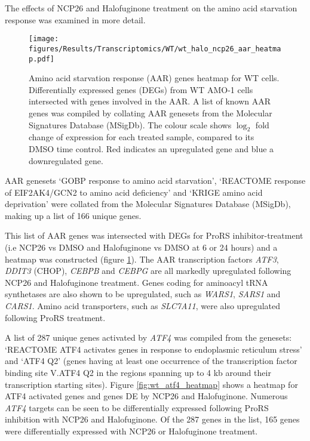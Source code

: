 The effects of NCP26 and Halofuginone treatment on the amino acid starvation response was examined in more detail.
\begin{figure}[p]
\centering
\texttt{[image: figures/Results/Transcriptomics/WT/wt\_halo\_ncp26\_aar\_heatmap.pdf]}
\caption[Amino acid starvation response genes heatmap WT cells]{Amino acid starvation response (AAR) genes heatmap for WT cells.
Differentially expressed genes (DEGs) from WT AMO-1 cells intersected with genes involved in the AAR.
A list of known AAR genes was compiled by collating AAR genesets from the Molecular Signatures Database (MSigDb).
The colour scale shows $\log_{2}$ fold change of expression for each treated sample, compared to its DMSO time control.
Red indicates an upregulated gene and blue a downregulated gene.
}
\label{fig:wt_aar_heatmap}
\end{figure}
%
AAR genesets `GOBP response to amino acid starvation', `REACTOME response of EIF2AK4/GCN2 to amino acid deficiency' and `KRIGE amino acid deprivation' were collated from the Molecular Signatures Database (MSigDb), making up a list of 166 unique genes.


This list of AAR genes was intersected with DEGs for ProRS inhibitor-treatment (i.e NCP26 vs DMSO and Halofuginone vs DMSO at 6 or 24 hours) and a heatmap was constructed (figure \ref{fig:wt_aar_heatmap}).
The AAR transcription factors \textit{ATF3}, \textit{DDIT3} (CHOP), \textit{CEBPB} and \textit{CEBPG} are all markedly upregulated following NCP26 and Halofuginone treatment.
Genes coding for aminoacyl tRNA synthetases are also shown to be upregulated, such as \textit{WARS1}, \textit{SARS1} and \textit{CARS1}.
Amino acid transporters, such as \textit{SLC7A11}, were also upregulated following ProRS treatment.

A list of 287 unique genes activated by \textit{ATF4} was compiled from the genesets: `REACTOME ATF4 activates genes in response to endoplasmic reticulum stress' and `ATF4 Q2' (genes having at least one occurrence of the transcription factor binding site V.ATF4 Q2 in the regions spanning up to 4 kb around their transcription starting sites).
Figure \ref{fig:wt_atf4_heatmap} shows a heatmap for ATF4 activated genes and genes DE by NCP26 and Halofuginone.
Numerous \textit{ATF4} targets can be seen to be differentially expressed following ProRS inhibition with NCP26 and Halofuginone.
Of the 287 genes in the list, 165 genes were differentially expressed with NCP26 or Halofuginone treatment.


